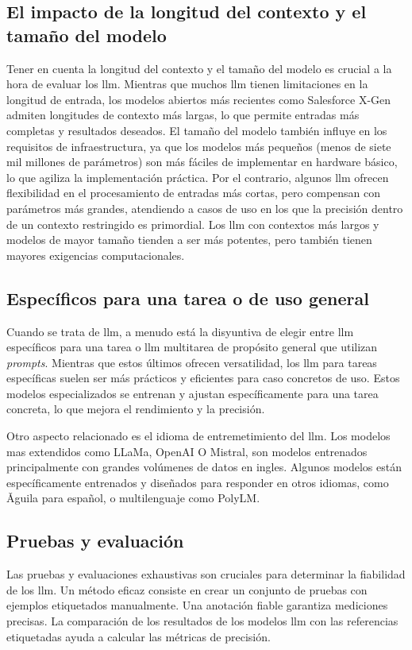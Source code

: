 \subsection{El impacto de la longitud del contexto y el tamaño del modelo}
Tener en cuenta la longitud del contexto y el tamaño del modelo es crucial a la hora de evaluar los \acrshort{llm}. Mientras que muchos \acrshort{llm} tienen limitaciones en la longitud de entrada, los modelos abiertos más recientes como Salesforce X-Gen admiten longitudes de contexto más largas, lo que permite entradas más completas y resultados deseados. El tamaño del modelo también influye en los requisitos de infraestructura, ya que los modelos más pequeños (menos de siete mil millones de parámetros) son más fáciles de implementar en hardware básico, lo que agiliza la implementación práctica. Por el contrario, algunos \acrshort{llm} ofrecen flexibilidad en el procesamiento de entradas más cortas, pero compensan con parámetros más grandes, atendiendo a casos de uso en los que la precisión dentro de un contexto restringido es primordial. Los \acrshort{llm} con contextos más largos y modelos de mayor tamaño tienden a ser más potentes, pero también tienen mayores exigencias computacionales.

\subsection{Específicos para una tarea o de uso general}
Cuando se trata de \acrfull{llm}, a menudo está la disyuntiva de elegir entre \acrshort{llm} específicos para una tarea o \acrshort{llm} multitarea de propósito general que utilizan \textit{prompts}. Mientras que estos últimos ofrecen versatilidad, los \acrshort{llm} para tareas específicas suelen ser más prácticos y eficientes para caso concretos de uso. Estos modelos especializados se entrenan y ajustan específicamente para una tarea concreta, lo que mejora el rendimiento y la precisión. 

Otro aspecto relacionado es el idioma de entremetimiento del \acrshort{llm}. Los modelos mas extendidos como LLaMa, OpenAI O Mistral, son modelos entrenados principalmente con grandes volúmenes de datos en ingles. Algunos modelos están específicamente entrenados y diseñados para responder en otros idiomas, como Ǎguila\cite{Ǎguila} para español, o multilenguaje como PolyLM\cite{wei2023polylm}.

\subsection{Pruebas y evaluación}
Las pruebas y evaluaciones exhaustivas son cruciales para determinar la fiabilidad de los \acrshort{llm}. Un método eficaz consiste en crear un conjunto de pruebas con ejemplos etiquetados manualmente. Una anotación fiable garantiza mediciones precisas. La comparación de los resultados de los modelos \acrshort{llm} con las referencias etiquetadas ayuda a calcular las métricas de precisión. 

